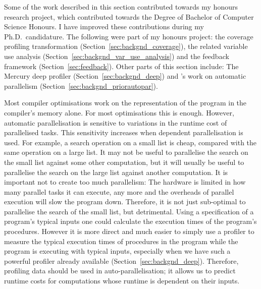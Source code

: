 

Some of the work described in this section contributed towards my honours
research project,
which contributed towards 
the Degree of Bachelor of Computer Science Honours.
I have improved these contributions during my Ph.D.\
candidature.
The following were part of my honours project:
the coverage profiling transformation (Section~\ref{sec:backgnd_coverage}),
the related variable use analysis (Section~\ref{sec:backgnd_var_use_analysis})
and the feedback framework (Section~\ref{sec:feedback}).
Other parts of this section include:
The Mercury deep profiler \citep{conway:2001:mercury-deep}
(Section~\ref{sec:backgnd_deep}) and
\citet*{tannier:2007:parallel_mercury}'s work on automatic parallelism
(Section~\ref{sec:backgnd_priorautopar}).

Most compiler optimisations work on the representation of the program in
the compiler's memory alone.
For most optimisations this is enough.
However,
automatic parallelisation is sensitive to variations in the runtime cost of
parallelised tasks.
This sensitivity increases when dependent parallelisation is used.
For example,
a search operation on a small list is cheap, compared with the same operation on
a large list.
It may not be useful to parallelise the search on the small list against some
other computation,
but it will usually be useful to parallelise the search on the large list
against another computation.
It is important not to create too much parallelism:
The hardware is limited in how many parallel tasks it can execute,
any more and the overheads of parallel execution will slow the program down.
Therefore, it is not just sub-optimal to parallelise the search of the small
list,
but detrimental.
Using a specification of a program's typical inputs one could
calculate the execution times of the program's procedures.
However it is more direct and much easier to simply use a profiler to
measure the typical execution times of procedures in the program
while the program is executing with typical inputs,
especially when we have such a powerful profiler already available
(Section~\ref{sec:backgnd_deep}).
Therefore,
profiling data should be used in auto-parallelisation;
it allows us to predict runtime costs for computations whose
runtime is dependent on their inputs.

